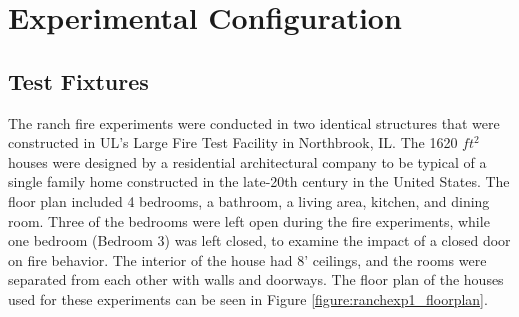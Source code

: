 \documentclass[12pt,oneside]{book}
\begin{document}









\clearpage

\chapter{Experimental Configuration}

\section{Test Fixtures}

The ranch fire experiments were conducted in two identical structures that were constructed in UL's Large Fire Test Facility in Northbrook, IL. The 1620 $ft^2$ houses were designed by a residential  architectural company to be typical of a single family home constructed in the late-20th century in the United States. The floor plan included 4 bedrooms, a bathroom, a living area, kitchen, and dining room. Three of the bedrooms were left open during the fire experiments, while one bedroom (Bedroom 3) was left closed, to examine the impact of a closed door on fire behavior. The interior of the house had 8' ceilings, and the rooms were separated from each other with walls and doorways. The floor plan of the houses used for these experiments can be seen in Figure \ref{figure:ranchexp1_floorplan}.
\end{document}
